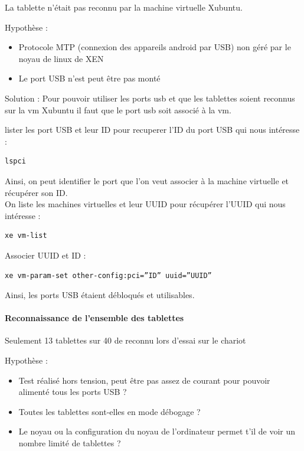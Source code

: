 \documentclass[a4paper,12pt]{extarticle}
\begin{document}
La tablette n’était pas reconnu par la machine virtuelle Xubuntu.

Hypothèse :
\begin{itemize}
\item Protocole MTP (connexion des appareils android par USB) non géré par le noyau de linux de XEN
\item Le port USB n’est peut être pas monté \\
\end{itemize}

Solution :
Pour pouvoir utiliser les ports usb et que les tablettes soient reconnus sur la vm Xubuntu il faut que le port usb soit associé à la vm. 

lister les port USB et leur ID pour recuperer l'ID du port USB qui nous intéresse :
\begin{verbatim}
lspci
\end{verbatim}
Ainsi, on peut identifier le port que l’on veut associer à la machine virtuelle et récupérer son ID.\\
On liste les machines virtuelles et leur UUID pour récupérer l’UUID qui nous intéresse :
\begin{verbatim}
xe vm-list
\end{verbatim}

Associer UUID et ID :
\begin{verbatim}
xe vm-param-set other-config:pci=”ID” uuid=”UUID”
\end{verbatim}
Ainsi, les ports USB étaient débloqués et utilisables.



\paragraph{Reconnaissance de l'ensemble des tablettes\\}
Seulement 13 tablettes sur 40 de reconnu lors d'essai sur le chariot

Hypothèse :
\begin{itemize}
\item Test réalisé hors tension, peut être pas assez de courant pour pouvoir alimenté tous les ports USB ? 
\item Toutes les tablettes sont-elles en mode débogage ? 
\item Le noyau ou la configuration du noyau de l'ordinateur permet t'il de voir un nombre limité de tablettes ? \\
\end{itemize}
\end{document}

